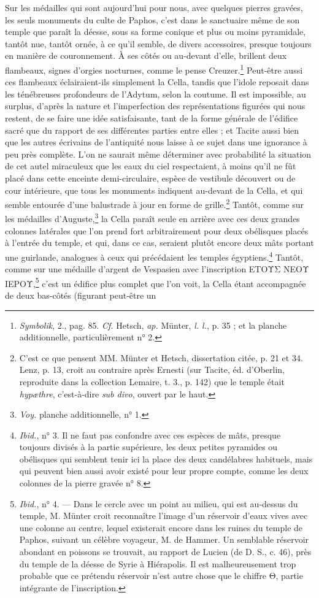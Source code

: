 \documentclass[a4paper, 11pt, oneside, polutonikogreek, french]{article}
\begin{document}
Sur les médailles qui sont aujourd'hui pour nous, avec quelques pierres gravées, les seuls monuments du culte de Paphos, c'est dans le sanctuaire même de son temple que paraît la déesse, sous sa forme conique et plus ou moins pyramidale, tantôt nue, tantôt ornée, à ce qu'il semble, de divers accessoires, presque toujours en manière de couronnement. À ses côtés ou au-devant d'elle, brillent deux flambeaux, signes d'orgies nocturnes, comme le pense Creuzer.\footnote{\emph{Symbolik}, 2., pag. 85. \emph{Cf.} Hetsch, \emph{ap.} Münter, \emph{l. l.}, p. 35 ; et la planche additionnelle, particulièrement n° 2.} Peut-être aussi ces flambeaux éclairaient-ils simplement la Cella, tandis que l'idole reposait dans les ténébreuses profondeurs de l'Adytum, selon la coutume. Il est impossible, au surplus, d'après la nature et l'imperfection des représentations figurées qui nous restent, de se faire une idée satisfaisante, tant de la forme générale de l'édifice sacré que du rapport de ses différentes parties entre elles ; et Tacite aussi bien que les autres écrivains de l'antiquité nous laisse à ce sujet dans une ignorance à peu près complète. L'on ne saurait même déterminer avec probabilité la situation de cet autel miraculeux que les eaux du ciel respectaient, à moins qu'il ne fût placé dans cette enceinte demi-circulaire, espèce de vestibule découvert ou de cour intérieure, que tous les monuments indiquent au-devant de la Cella, et qui semble entourée d'une balustrade à jour en forme de grille.\footnote{C'est ce que pensent MM. Münter et Hetsch, dissertation citée, p. 21 et 34. Lenz, p. 13, croit au contraire après Ernesti (sur Tacite, éd. d'Oberlin, reproduite dans la collection Lemaire, t. 3., p. 142) que le temple était \emph{hypæthre}, c'est-à-dire \emph{sub divo}, ouvert par le haut.} Tantôt, comme sur les médailles d'Auguste,\footnote{\emph{Voy.} planche additionnelle, n° 1.} la Cella paraît seule en arrière avec ces deux grandes colonnes latérales que l'on prend fort arbitrairement pour deux obélisques placés à l'entrée du temple, et qui, dans ce cas, seraient plutôt encore deux mâts portant une guirlande, analogues à ceux qui précédaient les temples égyptiens.\footnote{\emph{Ibid.}, n° 3. Il ne faut pas confondre avec ces espèces de mâts, presque toujours divisés à la partie supérieure, les deux petites pyramides ou obélisques qui semblent tenir ici la place des deux candélabres habituels, mais qui peuvent bien aussi avoir existé pour leur propre compte, comme les deux colonnes de la pierre gravée n° 8.} Tantôt, comme sur une médaille d'argent de Vespasien avec l'inscription ΕΤΟΥΣ ΝΕΟΥ ΙΕΡΟΥ,\footnote{\emph{Ibid.}, n° 4. --- Dans le cercle avec un point au milieu, qui est au-dessus du temple, M. Münter croit reconnaître l'image d'un réservoir d'eaux vives avec une colonne au centre, lequel existerait encore dans les ruines du temple de Paphos, suivant un célèbre voyageur, M. de Hammer. Un semblable réservoir abondant en poissons se trouvait, au rapport de Lucien (de D. S., c. 46), près du temple de la déesse de Syrie à Hiérapolis. Il est malheureusement trop probable que ce prétendu réservoir n'est autre chose que le chiffre Θ, partie intégrante de l'inscription.} c'est un édifice plus complet que l'on voit, la Cella étant accompagnée de deux bas-côtés (figurant peut-être un 
\end{document}
